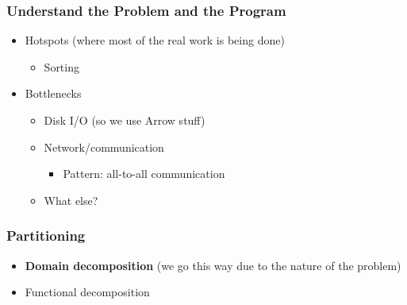 \documentclass{beamer}
\begin{document}
\begin{frame}
\frametitle{Understand the Problem and the Program}


\begin{itemize}
  \item Hotspots (where most of the real work is being done)
    \begin{itemize}
      \item Sorting
    \end{itemize}
  \item Bottlenecks
    \begin{itemize}
      \item Disk I/O \alert{(so we use Arrow stuff)}
      \item Network/communication
       \begin{itemize}
        \item Pattern: all-to-all communication
       \end{itemize}
      \item What else?
    \end{itemize}
\end{itemize}
    
\end{frame}

\begin{frame}
\frametitle{Partitioning}

\begin{itemize}
  \item \textbf{Domain decomposition} \alert{(we go this way due to the nature of the problem)}
  \item Functional decomposition
\end{itemize}
  
\end{frame}
\end{document}
